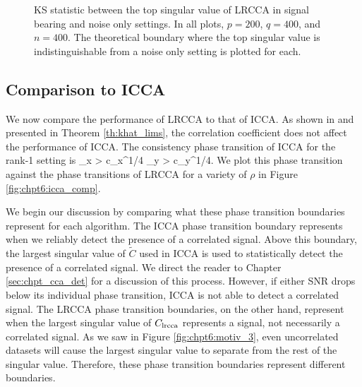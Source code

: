 \begin{figure}[!htbp]
{  }
  \caption{KS statistic between the top singular value of LRCCA in signal bearing and
    noise only settings. In all plots, $p=200$, $q=400$, and $n=400$. The theoretical boundary where
    the top singular value is indistinguishable from a noise only setting is plotted for
    each.}
  \label{fig:chpt6:lrcca_ks}
\end{figure}

\subsection{Comparison to ICCA}

We now compare the performance of LRCCA to that of ICCA. As shown in
\cite{nadakuditi2011fundamental} and presented in Theorem \ref{th:khat_lims}, the
correlation coefficient does not affect the performance of ICCA. The consistency phase
transition of ICCA for the rank-1 setting is  
\be
\theta_x > c_x^{1/4}  \theta_y > c_y^{1/4}.
\ee
We plot this phase transition against the phase transitions of LRCCA for a variety of
$\rho$ in Figure \ref{fig:chpt6:icca_comp}. 

We begin our discussion by comparing what these phase transition boundaries represent for
each algorithm. The ICCA phase transition boundary represents when we reliably detect the
presence of a correlated signal. Above this boundary, the largest singular value of
$\widetilde{C}$ used in ICCA is used to statistically detect the presence of a correlated
signal. We direct the reader to Chapter \ref{sec:chpt_cca_det} for a discussion of this
process. However, if either SNR drops below its individual phase transition, ICCA is not
able to detect a correlated signal. The LRCCA phase transition boundaries, on the other
hand, represent when the largest singular value of $C_{\text{lrcca}}$ represents a signal, not
necessarily a correlated signal. As we saw in Figure \ref{fig:chpt6:motiv_3}, even
uncorrelated datasets will cause the largest singular value to separate from the rest of
the singular value. Therefore, these phase transition boundaries represent different
boundaries. 

